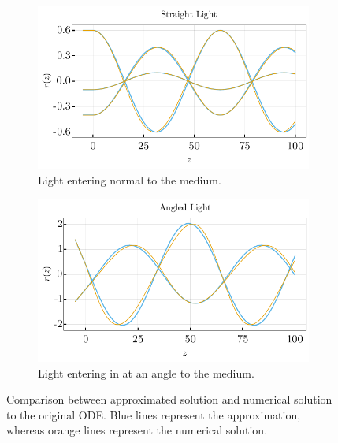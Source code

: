 \documentclass[%
 amsmath,amssymb,
aps,
 fleqn,
 notitlepage,
]{revtex4-2}
\begin{document}
\begin{figure}
    \begin{subfigure}{.5\textwidth}
      \includegraphics[width=.9\linewidth]{ray_comp.pdf}
      \caption{Light entering normal to the medium.}
    \end{subfigure}%
    \begin{subfigure}{.5\textwidth}
      \includegraphics[width=.9\linewidth]{ray_comp_angled.pdf}
      \caption{Light entering in at an angle to the medium.}
    \end{subfigure}
    \caption{Comparison between approximated solution and numerical solution to the original ODE.  Blue lines represent the approximation, whereas orange lines represent the numerical solution.}
    \label{fig: anal_sim}
\end{figure}
\end{document}
